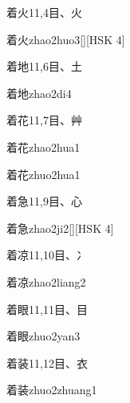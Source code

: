\begin{entry}{着火}{11,4}{⽬、⽕}
  \begin{phonetics}{着火}{zhao2huo3}[][HSK 4]
  \end{phonetics}
\end{entry}

\begin{entry}{着地}{11,6}{⽬、⼟}
  \begin{phonetics}{着地}{zhao2di4}
  \end{phonetics}
\end{entry}

\begin{entry}{着花}{11,7}{⽬、⾋}
  \begin{phonetics}{着花}{zhao2hua1}
  \end{phonetics}
  \begin{phonetics}{着花}{zhuo2hua1}
  \end{phonetics}
\end{entry}

\begin{entry}{着急}{11,9}{⽬、⼼}
  \begin{phonetics}{着急}{zhao2ji2}[][HSK 4]
  \end{phonetics}
\end{entry}

\begin{entry}{着凉}{11,10}{⽬、⼎}
  \begin{phonetics}{着凉}{zhao2liang2}
  \end{phonetics}
\end{entry}

\begin{entry}{着眼}{11,11}{⽬、⽬}
  \begin{phonetics}{着眼}{zhuo2yan3}
  \end{phonetics}
\end{entry}

\begin{entry}{着装}{11,12}{⽬、⾐}
  \begin{phonetics}{着装}{zhuo2zhuang1}
  \end{phonetics}
\end{entry}

